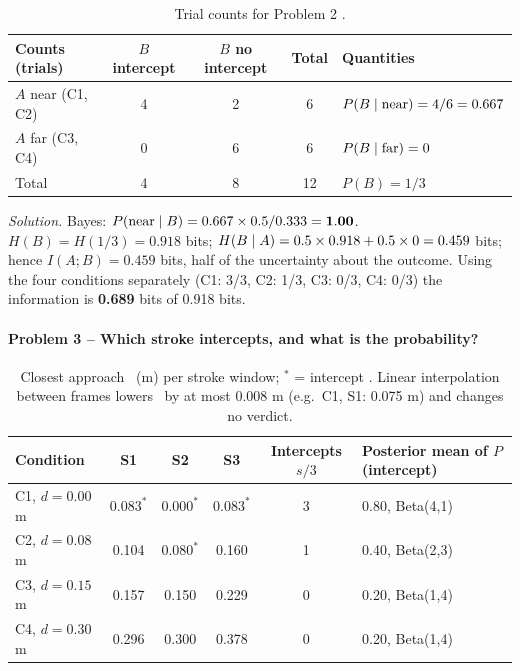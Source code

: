 \begin{table}[ht]
    \centering
    \caption{Trial counts for Problem 2 \tagsim.}\label{tab:p2}
    \footnotesize
    \begin{tabular}{@{}l c c c l@{}}
        \toprule
        \textbf{Counts (trials)} & \textbf{$B$ intercept} & \textbf{$B$ no intercept} & \textbf{Total} & \textbf{Quantities}               \\
        \midrule
        $A$ near (C1, C2)        & 4                      & 2                         & 6              & $P(B\mid\text{near})=4/6=0.667$ \\
        $A$ far (C3, C4)         & 0                      & 6                         & 6              & $P(B\mid\text{far})=0$          \\
        Total                    & 4                      & 8                         & 12             & $P(B)=1/3$                        \\
        \bottomrule
    \end{tabular}
\end{table}

\emph{Solution.} Bayes: $P(\text{near}\mid B)=0.667\times0.5/0.333=\mathbf{1.00}$. $H(B)=H(1/3)=0.918$ bits; $H(B\mid A)=0.5\times0.918+0.5\times0=0.459$ bits; hence $I(A;B)=\mathbf{0.459}$ bits, half of the uncertainty about the outcome. Using the four conditions separately (C1: 3/3, C2: 1/3, C3: 0/3, C4: 0/3) the information is \textbf{0.689} bits of 0.918 bits.

\paragraph{Problem 3 -- Which stroke intercepts, and what is the probability?}

\begin{table}[ht]
    \centering
    \caption{Closest approach \dmin\ (m) per stroke window; $^{*}$ = intercept \tagsim. Linear interpolation between frames lowers \dmin\ by at most 0.008 m (e.g.\ C1, S1: 0.075 m) and changes no verdict.}\label{tab:p3}
    \footnotesize
    \begin{tabular}{@{}l c c c c l@{}}
        \toprule
        \textbf{Condition} & \textbf{S1} & \textbf{S2} & \textbf{S3} & \textbf{Intercepts $s/3$} & \textbf{Posterior mean of $P$(intercept)} \\
        \midrule
        C1, $d=0.00$ m     & $0.083^{*}$ & $0.000^{*}$ & $0.083^{*}$ & 3                         & 0.80, Beta(4,1)                           \\
        C2, $d=0.08$ m     & 0.104       & $0.080^{*}$ & 0.160       & 1                         & 0.40, Beta(2,3)                           \\
        C3, $d=0.15$ m     & 0.157       & 0.150       & 0.229       & 0                         & 0.20, Beta(1,4)                           \\
        C4, $d=0.30$ m     & 0.296       & 0.300       & 0.378       & 0                         & 0.20, Beta(1,4)                           \\
        \bottomrule
    \end{tabular}
\end{table}

